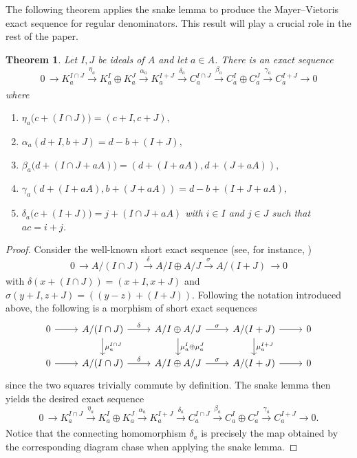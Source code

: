 \documentclass[11pt,leqno]{amsart}
\newcommand{\aar}[2][]{\xrightarrow[#1]{#2}}
\newtheorem{theorem}{Theorem}[section]
\theoremstyle{definition}
\numberwithin{equation}{section}
\begin{document}
The following theorem applies the snake lemma to produce the Mayer--Vietoris exact sequence for regular denominators. This result will play a crucial role in the rest of the paper. 

\begin{theorem}\label{thmMayerVietsequence}
    Let $I,J$ be ideals of $A$ and let $a\in A$. There is an exact sequence 
    $$0\,\aar{} K^{I \cap J}_a \aar{\eta_a} {K_a^I \oplus K_a^J} \aar{\alpha_a} K_a^{I+J}  \aar{\delta_a} C_a^{I \cap J} \aar{\beta_a} {C_a^I \oplus C_a^J} \aar{\gamma_a} C_a^{I+J} \aar{} 0 $$
    where 
\begin{enumerate}
\item[$\bullet$] $\eta_a\bigl(c+(I\cap J)\bigr)
    = (c+I,c+J),$
\item[$\bullet$] $\alpha_a(d+I,b+J)
  =d-b+(I+J),$
\item[$\bullet$]    $\beta_a\bigl(d+(I\cap J+aA)\bigr)
   =(d+(I+aA),d+(J+aA)),$
\item[$\bullet$] $\gamma_a(d+(I+aA),b+(J+aA))
    =d-b+(I+J+aA),$

    \item[$\bullet$] $\delta_a\bigl(c+(I+J)\bigr)=j+(I\cap J+aA)
    $ with $i\in I$ and $j\in J$ such that $ac=i+j$.
\end{enumerate}
\end{theorem}

\begin{proof}
    Consider the well-known short exact sequence (see, for instance, \cite[Lemma 29.4.6, Tag 0C4J]{Stk26})
    $$0\, \aar{} A/(I\cap J) \aar{\delta} {A/I \oplus A/J} \aar{\sigma} A/(I+J)\, \aar{} 0$$
    with $\delta(x+(I\cap J))=(x+I, x+J)$ and $\sigma (y+I,z+J)=((y-z)+(I+J))$. Following the notation introduced above, the following is a morphism of short exact sequences
   \[\begin{tikzcd}[ampersand replacement=\&]
	0 \& {A/(I\cap J)} \& {A/I \oplus A/J} \& {A/(I+J)} \& 0 \\
	0 \& {A/(I\cap J)} \& {A/I \oplus A/J} \& {A/(I+J)} \& 0
	\arrow[from=1-1, to=1-2]
	\arrow["\delta", from=1-2, to=1-3]
	\arrow["{\mu_a^{I \cap J}}", from=1-2, to=2-2]
	\arrow["\sigma", from=1-3, to=1-4]
	\arrow["{\mu_a^I\oplus \mu_a^J}", from=1-3, to=2-3]
	\arrow[from=1-4, to=1-5]
	\arrow["{\mu_a^{I+J}}", from=1-4, to=2-4]
	\arrow[from=2-1, to=2-2]
	\arrow["\delta", from=2-2, to=2-3]
	\arrow["\sigma", from=2-3, to=2-4]
	\arrow[from=2-4, to=2-5]
\end{tikzcd}\]
since the two squares trivially commute by definition. The snake lemma then yields the desired exact sequence
$$0\,\aar{} K^{I \cap J}_a \aar{\eta_a} {K_a^I \oplus K_a^J} \aar{\alpha_a} K_a^{I+J}  \aar{\delta_a} C_a^{I \cap J} \aar{\beta_a} {C_a^I \oplus C_a^J} \aar{\gamma_a} C_a^{I+J} \aar{} 0.$$
Notice that the connecting homomorphism $\delta_a$ is precisely the map obtained by the corresponding diagram chase when applying the snake lemma.
\end{proof}
\end{document}

